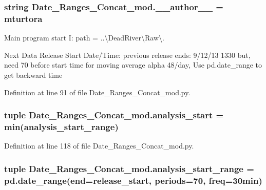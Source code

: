 \subsubsection[{\+\_\+\+\_\+author\+\_\+\+\_\+}]{\setlength{\rightskip}{0pt plus 5cm}string Date\+\_\+\+Ranges\+\_\+\+Concat\+\_\+mod.\+\_\+\+\_\+author\+\_\+\+\_\+ = \textquotesingle{}mturtora\textquotesingle{}}\label{namespace_date___ranges___concat__mod_a95cae999ceb9637283600cf3186e2a68}


Main program start I\+: path = \textquotesingle{}..\textbackslash{}Dead\+River\textbackslash{}Raw\textbackslash{}\textquotesingle{}. 

Next Data Release Start Date/\+Time\+: previous release ends\+: 9/12/13 1330 but, need 70 before start time for moving average alpha 48/day, Use pd.\+date\+\_\+range to get backward time 

Definition at line 91 of file Date\+\_\+\+Ranges\+\_\+\+Concat\+\_\+mod.\+py.

\hypertarget{namespace_date___ranges___concat__mod_a9a8ee3741706967bbeca1b4c38f25563}{}
\subsubsection[{analysis\+\_\+start}]{\setlength{\rightskip}{0pt plus 5cm}tuple Date\+\_\+\+Ranges\+\_\+\+Concat\+\_\+mod.\+analysis\+\_\+start = min({\bf analysis\+\_\+start\+\_\+range})}\label{namespace_date___ranges___concat__mod_a9a8ee3741706967bbeca1b4c38f25563}


Definition at line 118 of file Date\+\_\+\+Ranges\+\_\+\+Concat\+\_\+mod.\+py.

\hypertarget{namespace_date___ranges___concat__mod_a793a36c383b1e5c6447a6ac222c5bd17}{}
\subsubsection[{analysis\+\_\+start\+\_\+range}]{\setlength{\rightskip}{0pt plus 5cm}tuple Date\+\_\+\+Ranges\+\_\+\+Concat\+\_\+mod.\+analysis\+\_\+start\+\_\+range = pd.\+date\+\_\+range(end={\bf release\+\_\+start}, periods=70, freq=\textquotesingle{}30min\textquotesingle{})}\label{namespace_date___ranges___concat__mod_a793a36c383b1e5c6447a6ac222c5bd17}


